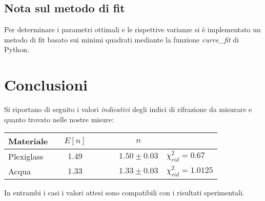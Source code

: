 \documentclass{article}[a4paper,11pt]
\begin{document}
\subsection*{Nota sul metodo di fit}
Per determinare i parametri ottimali e le rispettive varianze si \`e implementato un metodo di fit basato sui minimi quadrati mediante la funzione \emph{curve\_fit} di Python.

\section{Conclusioni}
Si riportano di seguito i valori \emph{indicativi} degli indici di rifrazione
da misurare e quanto trovato nelle nostre misure:
\begin{center}
\begin{tabular}{lccccccl}
\midrule
Materiale & & $E[n]$ & & & & $n$ & \\
\midrule
\midrule
Plexiglass & & $1.49$ & & & &$1.50 \pm 0.03 $& $\chi_{rid}^2 = 0.67$\\
Acqua & & $1.33$ & & & & $1.33 \pm 0.03$ & $\chi_{rid}^2 = 1.0125$\\
\bottomrule
\end{tabular}
\end{center}
In entrambi i casi i valori attesi sono compatibili con i risultati sperimentali.
\end{document}
